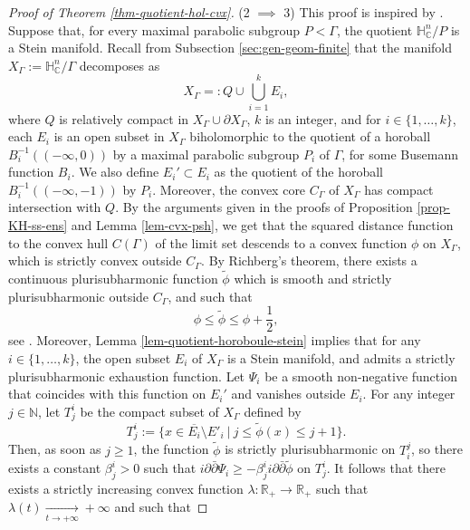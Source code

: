 \documentclass{article}
\theoremstyle{definition}
\theoremstyle{remark}
\newcommand{\C}{\mathbb{C}}
\newcommand{\R}{\mathbb{R}}
\newcommand{\N}{\mathbb{N}}
\newcommand{\HNC}{\mathbb{H}^{n}_{\C}}
\begin{document}
\begin{proof}[Proof of Theorem \ref{thm-quotient-hol-cvx}]
		
		(2 $\implies$ 3) This proof is inspired by \cite[Proof of Theorem 1.4]{chenDiscreteGroupsHolomorphic2013}. Suppose that, for every maximal parabolic subgroup $P<\Gamma$, the quotient $\HNC/P$ is a Stein manifold. Recall from Subsection \ref{sec:gen-geom-finite} that the manifold $X_{\Gamma}:=\HNC/\Gamma$ decomposes as
		\begin{equation*}
			X_{\Gamma} =: Q \cup \bigcup_{i=1}^{k}E_i,
		\end{equation*}
		where $Q$ is relatively compact in $X_{\Gamma} \cup \partial X_{\Gamma}$, $k$ is an integer, and for $i\in \{1,\dots,k\}$, each $E_i$ is an open subset in $X_{\Gamma}$ biholomorphic to the quotient of a horoball $B_i^{-1}((-\infty,0))$ by a maximal parabolic subgroup $P_i$ of $\Gamma$, for some Busemann function $B_i$. We also define $E_i'\subset E_i$ as the quotient of the horoball $B_i^{-1}((-\infty,-1))$ by $P_i$. Moreover, the convex core $C_{\Gamma}$ of $X_{\Gamma}$ has compact intersection with $Q$. By the arguments given in the proofs of Proposition \ref{prop-KH-ss-ens} and Lemma \ref{lem-cvx-psh}, we get that the squared distance function to the convex hull $C(\Gamma)$ of the limit set descends to a convex function $\phi$ on $X_{\Gamma}$, which is strictly convex outside $C_{\Gamma}$. By Richberg's theorem, there exists a continuous plurisubharmonic function $\widetilde{\phi}$ which is smooth and strictly plurisubharmonic outside $C_{\Gamma}$, and such that\begin{equation*}
			\phi \le \widetilde{\phi} \le \phi + \frac{1}{2},
		\end{equation*}see \cite[Theorem I.5.21]{demaillyComplexAnalyticDifferential-manuel}. Moreover, Lemma \ref{lem-quotient-horoboule-stein} implies that for any $i\in \{1,\dots,k\}$, the open subset $E_i$ of $X_{\Gamma}$ is a Stein manifold, and admits a strictly plurisubharmonic exhaustion function. Let $\Psi_i$ be a smooth non-negative function that coincides with this function on $E_i'$ and vanishes outside $E_i$. For any integer $j\in \N$, let $T^{i}_j$ be the compact subset of $X_{\Gamma}$ defined by
		\begin{equation*}
			T^{i}_j := \{x\in \overline{E_i}\setminus E'_i \ \vert \ j\le \widetilde{\phi}(x) \le j+1\}.
		\end{equation*}
		Then, as soon as $j\ge1$, the function $\widetilde{\phi}$ is strictly plurisubharmonic on $T_i^{j}$, so there exists a constant $\beta^{i}_j>0$ such that $i\partial\bar{\partial} \Psi_i \ge -\beta^{i}_j i\partial\bar{\partial} \widetilde{\phi}$ on $T^{i}_j$. It follows that there exists a strictly increasing convex function $\lambda:\R_{+}\to\R_{+}$ such that $\lambda(t)\underset{t\to+\infty}{\longrightarrow}+\infty$ and such that

\end{proof}
\end{document}
